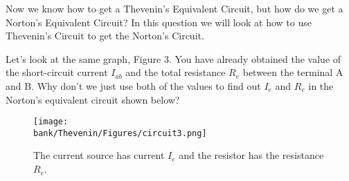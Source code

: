   Now we know how to get a Thevenin's Equivalent Circuit, but how do we get a Norton's Equivalent Circuit? 
  In this question we will look at how to use Thevenin's Circuit to get the Norton's Circuit.
  \begin{enumerate}[resume]
  \qitem Let's look at the same graph, Figure 3. You have already obtained the value of the short-circuit current $I_{ab}$ and 
  the total resistance $R_e$ between the terminal A and B. Why don't we just use both of the values to find out $I_e$ and $R_e$ in the Norton's equivalent circuit shown below?
  \begin{figure}[H]
    \centering
    \texttt{[image: \\bank/Thevenin/Figures/circuit3.png]}
    \caption{The current source has current $I_e$ and the resistor has the resistance $R_e$.}
    \label{A Circuit problem}
  \end{figure}

\end{enumerate}
